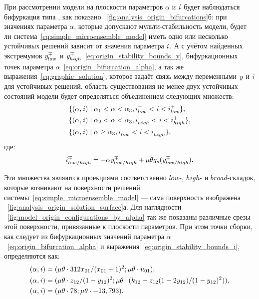 При рассмотрении модели на плоскости параметров $\alpha$ и $\mathit{i}$ будет наблюдаться бифуркация типа , как показано \onfigure~\ref{fig:analysis_origin_bifurcations}б: при значениях параметра $\alpha$, которые допускают мульти-стабильность модели, будет ли система~\eqref{eq:simple_microensemble_model} иметь одно или несколько устойчивых решений зависит от значения параметра $\mathit{i}$. А с учётом найденных экстремумов $\mathit{y}^{\mp}_{low}$ и $\mathit{y}^{\mp}_{high}$~\eqref{eq:origin_stability_bounds_y}, бифуркационных точек параметра $\alpha$~\eqref{eq:origin_bifurcation_alpha}, а так же выражения~\eqref{eq:graphic_solution}, которое задаёт связь между переменными $\mathit{y}$ и $\mathit{i}$ для устойчивых решений, область существования не менее двух устойчивых состояний модели будет определяться объединением следующих множеств:
\begin{equation}
    \label{eq:origin_stability_area}
    \begin{aligned}
        &\{ (\alpha, \mathit{i}) \mid \alpha_{1} < \alpha < \alpha_{3}, i^{-}_{low} < \mathit{i} < i^{+}_{low} \}, \\
        &\{ (\alpha, \mathit{i}) \mid \alpha_{2} < \alpha < \alpha_{3}, i^{-}_{high} < \mathit{i} < i^{+}_{high} \}, \\
        &\{ (\alpha, \mathit{i}) \mid \alpha \ge \alpha_{3}, i^{+}_{low} < \mathit{i} < i^{-}_{high} \}, \\
    \end{aligned}
\end{equation}
где:
\begin{equation}
    \label{eq:origin_stability_bounds_i}
    i^{\mp}_{low/high} = -\alpha \mathit{y}^{\mp}_{low/high} + \mu \theta g_{s}(\mathit{y}^{\mp}_{low/high}).
\end{equation}

Эти множества являются проекциями соответственно $low$-, $high$- и $broad$-складок, которые возникают на поверхности решений системы~\eqref{eq:simple_microensemble_model} --- сама поверхность изображена \onfigure~\ref{fig:analysis_origin_solution_surface}а. Для наглядности \onfigure~\ref{fig:model_origin_configurations_by_alpha} так же показаны различные срезы этой поверхности, привязанные к плоскости параметров. При этом точки сборки, как следует из бифуркационных значений параметра $\alpha$~\eqref{eq:origin_bifurcation_alpha} и выражения~\eqref{eq:origin_stability_bounds_i}, определяются как:
\begin{equation}
    \nonumber
    \begin{aligned}
        &(\alpha, \mathit{i}) = ( \mu \theta \cdot 312 x_{01} / (x_{01} + 1)^2 ; \mu \theta \cdot u_{01} ), \\
        &(\alpha, \mathit{i}) = ( \mu \theta \cdot z_{12} / (1 - y_{12})^2     ; \mu \theta \cdot (k_{12} + z_{12} (1 - 2 y_{12}) / (1 - y_{12})^{2}) ), \\
        &(\alpha, \mathit{i}) = ( \mu \theta \cdot 78                          ; \mu \theta \cdot -13,793 ).
    \end{aligned}
\end{equation}


